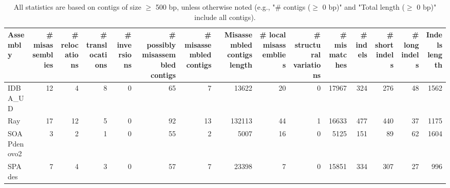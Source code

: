 \documentclass[12pt,a4paper]{article}
\begin{document}
\begin{table}[ht]
\begin{center}
\caption{All statistics are based on contigs of size $\geq$ 500 bp, unless otherwise noted (e.g., "\# contigs ($\geq$ 0 bp)" and "Total length ($\geq$ 0 bp)" include all contigs).}
\begin{tabular}{|l*{14}{|r}|}
\hline
Assembly & \# misassemblies &     \# relocations &     \# translocations &     \# inversions & \# possibly misassembled contigs & \# misassembled contigs & Misassembled contigs length & \# local misassemblies & \# structural variations & \# mismatches & \# indels &     \# short indels &     \# long indels & Indels length \\ \hline
IDBA\_UD & 12 & 4 & 8 & 0 & 65 & 7 & 13622 & 20 & 0 & 17967 & 324 & 276 & 48 & 1562 \\ \hline
Ray & 17 & 12 & 5 & 0 & 92 & 13 & 132113 & 44 & 1 & 16633 & 477 & 440 & 37 & 1175 \\ \hline
SOAPdenovo2 & 3 & 2 & 1 & 0 & 55 & 2 & 5007 & 16 & 0 & 5125 & 151 & 89 & 62 & 1604 \\ \hline
SPAdes & 7 & 4 & 3 & 0 & 57 & 7 & 23398 & 7 & 0 & 15851 & 334 & 307 & 27 & 996 \\ \hline
\end{tabular}
\end{center}
\end{table}
\end{document}
